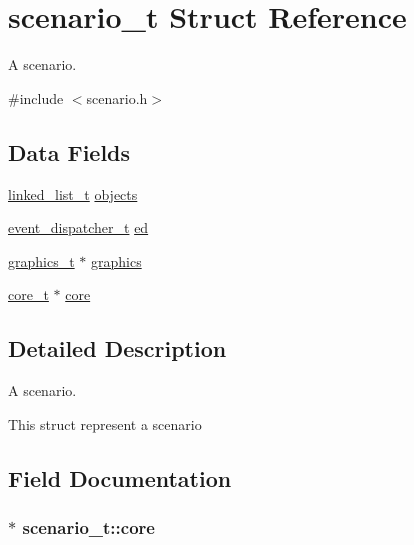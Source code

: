 \hypertarget{structscenario__t}{}\section{scenario\+\_\+t Struct Reference}
\label{structscenario__t}


A scenario.  




{\ttfamily \#include $<$scenario.\+h$>$}

\subsection*{Data Fields}
\begin{DoxyCompactItemize}
\item 
\hyperlink{structlinked__list__t}{linked\+\_\+list\+\_\+t} \hyperlink{structscenario__t_ab01a8a6fa25d26374ff9b261e7512c1c}{objects}
\item 
\hyperlink{structevent__dispatcher__t}{event\+\_\+dispatcher\+\_\+t} \hyperlink{structscenario__t_a8687b4f6cafb5c9d4e1b324cc8d5c7c9}{ed}
\item 
\hyperlink{structgraphics__t}{graphics\+\_\+t} $\ast$ \hyperlink{structscenario__t_a00790b5954aa1761fec84cbd3319ed16}{graphics}
\item 
\hyperlink{structcore__t}{core\+\_\+t} $\ast$ \hyperlink{structscenario__t_ab9e81b724a46c7be3d39f00d20bc9956}{core}
\end{DoxyCompactItemize}


\subsection{Detailed Description}
A scenario. 

This struct represent a scenario 

\subsection{Field Documentation}
\subsubsection[{\texorpdfstring{core}{core}}]{$\ast$ scenario\+\_\+t\+::core}\hypertarget{structscenario__t_ab9e81b724a46c7be3d39f00d20bc9956}{}\label{structscenario__t_ab9e81b724a46c7be3d39f00d20bc9956}
